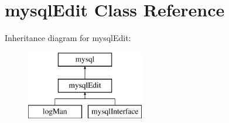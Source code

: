 \hypertarget{classmysql_edit}{\section{mysql\-Edit Class Reference}
\label{classmysql_edit}
}
Inheritance diagram for mysql\-Edit\-:\begin{figure}[H]
\begin{center}
\leavevmode
\includegraphics[height=3.000000cm]{classmysql_edit}
\end{center}
\end{figure}
